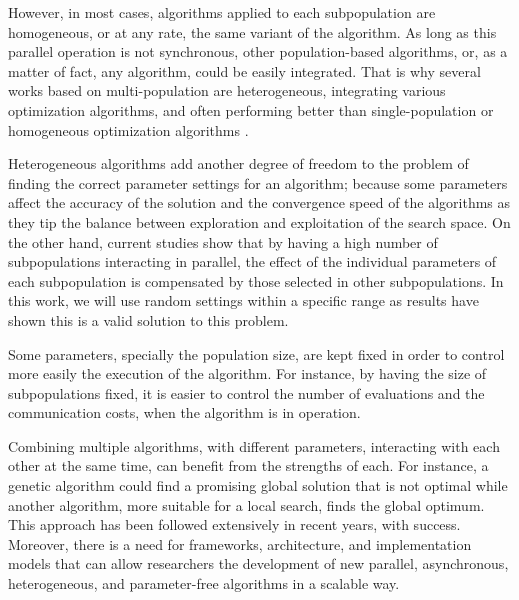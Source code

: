 \documentclass[runningheads]{llncs}
\begin{document}
However, in most cases, algorithms applied to each subpopulation are
homogeneous, or at any rate, the same variant of the algorithm. As long as this
parallel operation is not synchronous, other population-based algorithms, or, as
a matter of fact, any algorithm, could be easily integrated. That is why several
works based on multi-population are heterogeneous, integrating various
optimization algorithms, and often performing better than single-population or
homogeneous optimization algorithms \cite{wu2016differential,nseef2016adaptive}.

Heterogeneous algorithms add another degree of freedom to the problem of finding
the correct parameter settings for an algorithm; because some parameters affect
the accuracy of the solution and the convergence speed of the algorithms as they
tip the balance between exploration and exploitation of the search space. On the
other hand, current studies show that by having a high number of subpopulations
interacting in parallel, the effect of the individual parameters of each
subpopulation is compensated by those selected in other subpopulations. In this
work, we will use random settings within a specific range as results have shown
this is a valid solution to this problem. 

Some parameters, specially the population size, are
kept fixed in order to control more easily the execution of the algorithm. For
instance, by having the size of subpopulations fixed, it is easier to control
the number of evaluations and the communication costs, when the algorithm is in
operation.

Combining multiple algorithms, with different parameters, interacting with each
other at the same time, can benefit from the strengths of each. For instance, a
genetic algorithm could find a promising global solution that is not optimal
while another algorithm, more suitable for a local search, finds the global
optimum. This approach has been followed extensively in recent years, with
success. Moreover, there is a need for frameworks, architecture, and
implementation models that can allow researchers the development of new
parallel, asynchronous, heterogeneous, and parameter-free algorithms in a scalable way.  
\end{document}
